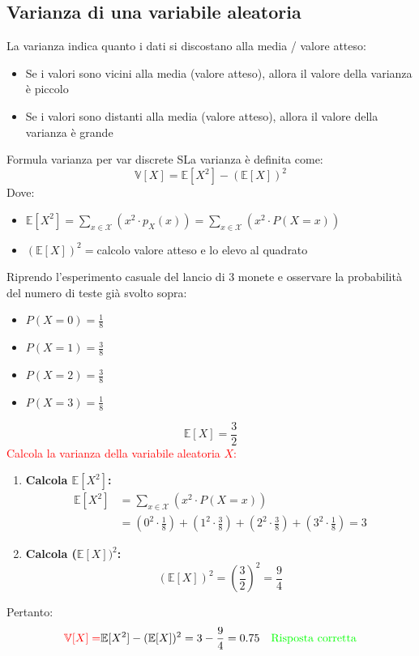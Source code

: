 \documentclass{article}  %
\theoremstyle{definition}
\begin{document}
\subsection{Varianza di una variabile aleatoria}
La varianza indica quanto i dati si discostano alla media / valore atteso:
\begin{itemize}
	\item Se i valori sono vicini alla media (valore atteso), allora il valore della varianza è piccolo
	\item Se i valori sono distanti alla media (valore atteso), allora il valore della varianza è grande
\end{itemize}
\begin{theorem}{Formula varianza per var discrete}
	SLa varianza è definita come:
	\[
		\mathbb{V}[X]=\mathbb{E}[X^2]-(\mathbb{E}[X])^2
	\]
	Dove:
	\begin{itemize}
		\item $\mathbb{E}[X^2]=\sum_{x \in \mathscr{X}}(x^2 \cdot p_X(x))=\sum_{x \in \mathscr{X}}(x^2 \cdot P(X=x))$
		\item $(\mathbb{E}[X])^2=$calcolo valore atteso e lo elevo al quadrato
	\end{itemize}
	\begin{esercizio}[Esercizio]
		Riprendo l'esperimento casuale del lancio di 3 monete e osservare la probabilità del numero di teste già svolto sopra:
		\begin{itemize}
			\item $P(X=0)=\frac{1}{8}$
			\item $P(X=1)=\frac{3}{8}$
			\item $P(X=2)=\frac{3}{8}$
			\item $P(X=3)=\frac{1}{8}$
		\end{itemize}
		\[
			\mathbb{E}[X]=\frac{3}{2}
		\]
		\textcolor{red}{Calcola la varianza della variabile aleatoria $X$:}
		\begin{enumerate}
			\item \textbf{Calcola $\mathbb{E}[X^2]$:}
			      \begin{align*}
				      \mathbb{E}[X^2]
				       & = \sum_{x \in \mathscr{X}}(x^2 \cdot P(X=x))                                                        \\
				       & = (0^2 \cdot \frac{1}{8})+(1^2 \cdot \frac{3}{8})+(2^2 \cdot \frac{3}{8})+(3^2 \cdot \frac{1}{8})=3
			      \end{align*}
			\item \textbf{Calcola ($\mathbb{E}[X])^2$:}
			      \[
				      (\mathbb{E}[X])^2=\left(\frac{3}{2}\right)^2=\frac{9}{4}
			      \]
		\end{enumerate}
		Pertanto:
		\[
			\textcolor{red}{\mathbb{V}[X]=} \mathbb{E}[X^2]-(\mathbb{E}[X])^2=3-\frac{9}{4}=0.75 \quad \textcolor{green}{\text{Risposta corretta}}
		\]
	\end{esercizio}
\end{theorem}
\end{document}
